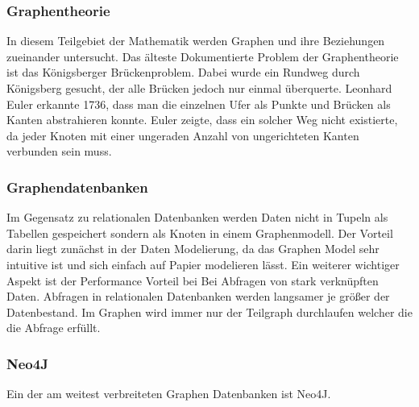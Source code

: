 	\subsubsection{Graphentheorie}
	In diesem Teilgebiet der Mathematik werden Graphen und ihre Beziehungen zueinander untersucht. Das älteste Dokumentierte Problem der Graphentheorie ist das Königsberger Brückenproblem. Dabei wurde ein Rundweg durch Königsberg gesucht, der alle Brücken jedoch nur einmal überquerte. Leonhard Euler erkannte 1736, dass man die einzelnen Ufer als Punkte und Brücken als Kanten abstrahieren konnte. Euler zeigte, dass ein solcher Weg nicht existierte, da jeder Knoten mit einer ungeraden Anzahl von ungerichteten Kanten verbunden sein muss.
	\subsubsection{Graphendatenbanken}	
	Im Gegensatz zu relationalen Datenbanken werden Daten nicht in Tupeln als Tabellen gespeichert sondern als Knoten in einem Graphenmodell. Der Vorteil darin liegt zunächst in der Daten Modelierung, da das Graphen Model sehr intuitive ist und sich einfach auf Papier modelieren lässt. 
	Ein weiterer wichtiger Aspekt ist der Performance Vorteil bei Bei Abfragen von stark verknüpften Daten. Abfragen in relationalen Datenbanken werden langsamer je größer der Datenbestand. Im Graphen wird immer nur der Teilgraph durchlaufen welcher die die Abfrage erfüllt.\cite[8]{robinson_webber_eifrem_2015}
	
	\subsubsection{Neo4J}
	
	Ein der am weitest verbreiteten Graphen Datenbanken ist Neo4J.
	